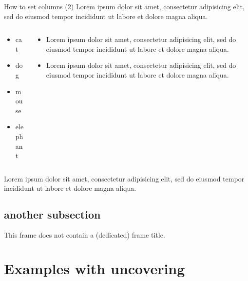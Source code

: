 \begin{frame}{How to set columns (2)}
  Lorem ipsum dolor sit amet, consectetur adipisicing elit, sed do eiusmod tempor incididunt ut labore et dolore magna aliqua.
  \begin{columns}[t]
    \begin{column}{.4\textwidth}
      \begin{itemize}
        \item cat
        \item dog
        \item mouse
        \item elephant
      \end{itemize}
    \end{column}
    \begin{column}{.6\textwidth}
      \begin{itemize}
        \item Lorem ipsum dolor sit amet, consectetur adipisicing elit, sed do eiusmod tempor incididunt ut labore et dolore magna aliqua.
        \item Lorem ipsum dolor sit amet, consectetur adipisicing elit, sed do eiusmod tempor incididunt ut labore et dolore magna aliqua.
      \end{itemize}
    \end{column}
  \end{columns}

  Lorem ipsum dolor sit amet, consectetur adipisicing elit, sed do eiusmod tempor incididunt ut labore et dolore magna aliqua.
\end{frame}

\subsection{another subsection}

\begin{frame}
  This frame does not contain a (dedicated) frame title.
\end{frame}

\section{Examples with uncovering}

